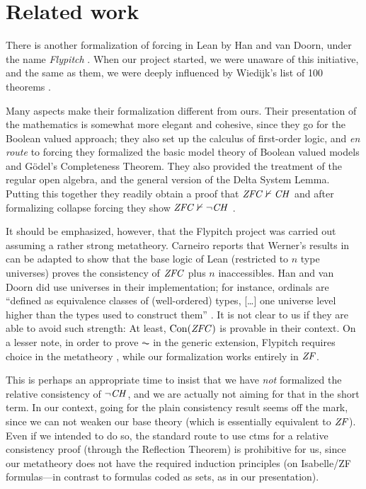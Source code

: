 \section{Related work}
\label{sec:related-work}

There is another formalization of forcing in Lean by Han and van
Doorn, under the name \emph{Flypitch} \cite{han_et_al:LIPIcs:2019:11074,DBLP:conf/cpp/HanD20}. When our project started, we
were unaware of this initiative, and the same as them, we were deeply
influenced by Wiedijk's list of 100 theorems \cite{Formalizing100}.

Many aspects make their formalization different from ours. Their
presentation of the mathematics is somewhat more elegant and cohesive,
since they go for the Boolean valued approach; they also  set up the
calculus of first-order logic, and \emph{en route} to forcing they
formalized the basic model theory of Boolean valued models and Gödel's
Completeness Theorem. They also provided the treatment of the regular
open algebra, and the general version of the Delta System
Lemma. Putting this together they readily obtain a proof that
$\mathit{ZFC}\nvdash \mathit{CH}$ \cite{han_et_al:LIPIcs:2019:11074} and after
formalizing collapse forcing they show  $\mathit{ZFC}\nvdash \neg\mathit{CH}$
\cite[Sect.~5.6]{DBLP:conf/cpp/HanD20}.

It should be emphasized, however, that the Flypitch project was
carried out assuming a rather strong metatheory.
Carneiro \cite{carneiro-ms-thesis} reports that Werner's results in
\cite{10.5555/645869.668660} can be adapted to show that the base
logic  of Lean (restricted to $n$
type universes) proves the consistency of $\mathit{ZFC}$ plus $n$
inaccessibles. Han and van Doorn did use universes in their
implementation; for instance, ordinals are “defined as equivalence
classes of (well-ordered) types, [\dots] one
universe level higher than the types used to construct them”
\cite{han_et_al:LIPIcs:2019:11074}. It is not clear to us if they are
able to avoid such strength: At least, $\operatorname{Con}(\mathit{ZFC})$ is provable in
their context. %
On a lesser note, in order to prove $\AC$ in the generic extension,
Flypitch requires choice in the metatheory
\cite[p.~11]{han_et_al:LIPIcs:2019:11074}, while our formalization works
entirely in $\mathit{ZF}$. %

This is perhaps an appropriate time to insist that we have \emph{not}
formalized the relative consistency of $\neg\mathit{CH}$, and we are actually
not aiming for that in the short term. In our context, going for the
plain consistency result seems off the mark, since we can not weaken
our base theory (which is essentially equivalent to $\mathit{ZF}$). %
Even if we intended to do so, the standard route to use ctms for a
relative consistency proof (through the Reflection Theorem) is
prohibitive for us, since our metatheory does not have the required
induction principles (on Isabelle/ZF formulas---in contrast to
formulas coded as sets, as in our presentation).

